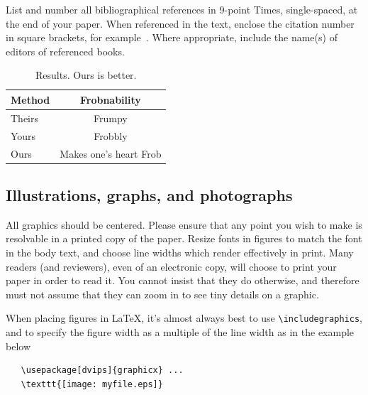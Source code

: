 \documentclass[10pt,twocolumn,letterpaper]{article}
\begin{document}
List and number all bibliographical references in 9-point Times,
single-spaced, at the end of your paper. When referenced in the text,
enclose the citation number in square brackets, for
example~\cite{Authors13}.  Where appropriate, include the name(s) of
editors of referenced books.

\begin{table}
\begin{center}
\begin{tabular}{|l|c|}
\hline
Method & Frobnability \\
\hline\hline
Theirs & Frumpy \\
Yours & Frobbly \\
Ours & Makes one's heart Frob\\
\hline
\end{tabular}
\end{center}
\caption{Results.   Ours is better.}
\end{table}

\subsection{Illustrations, graphs, and photographs}

All graphics should be centered.  Please ensure that any point you wish to
make is resolvable in a printed copy of the paper.  Resize fonts in figures
to match the font in the body text, and choose line widths which render
effectively in print.  Many readers (and reviewers), even of an electronic
copy, will choose to print your paper in order to read it.  You cannot
insist that they do otherwise, and therefore must not assume that they can
zoom in to see tiny details on a graphic.

When placing figures in \LaTeX, it's almost always best to use
\verb+\includegraphics+, and to specify the  figure width as a multiple of
the line width as in the example below
{\small\begin{verbatim}
   \usepackage[dvips]{graphicx} ...
   \texttt{[image: myfile.eps]}
\end{verbatim}
}





{\small


}
\end{document}
